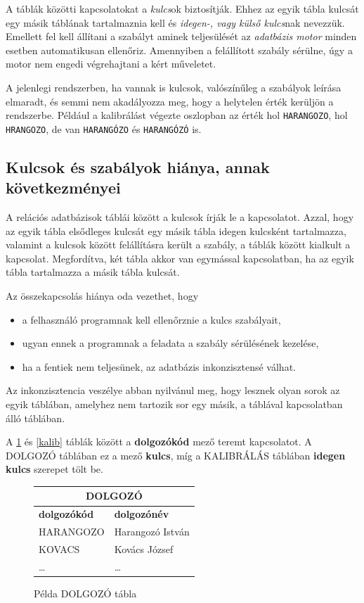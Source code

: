 \documentclass[a4paper,12pt]{report}
\begin{document}
A táblák közötti kapcsolatokat a \textit{kulcs}ok biztosítják. Ehhez az egyik 
tábla kulcsát egy másik táblának tartalmaznia kell és \textit{idegen-, vagy 
külső kulcs}nak nevezzük. Emellett fel kell állítani a szabályt aminek 
teljesülését az \textit{adatbázis motor} minden esetben automatikusan ellenőriz. 
Amennyiben a felállított szabály sérülne, úgy a motor nem engedi végrehajtani a 
kért műveletet.

A jelenlegi rendszerben, ha vannak is kulcsok, valószínűleg a szabályok leírása 
elmaradt, és semmi nem akadályozza meg, hogy a helytelen érték kerüljön a 
rendszerbe. Például a kalibrálást végezte oszlopban az érték hol 
\texttt{HARANGOZO}, hol \texttt{HRANGOZO}, de van \texttt{HARANGÓZO} és 
\texttt{HARANGÓZÓ} is.

\subsection{Kulcsok és szabályok hiánya, annak következményei}
A relációs adatbázisok táblái között a kulcsok írják le a kapcsolatot. Azzal, 
hogy az egyik tábla elsődleges kulcsát egy másik tábla idegen kulcsként 
tartalmazza, valamint a kulcsok között felállításra került a szabály, a táblák 
között kialkult a kapcsolat. Megfordítva, két tábla akkor van egymással 
kapcsolatban, ha az egyik tábla tartalmazza a másik tábla kulcsát.

Az összekapcsolás hiánya oda vezethet, hogy
\begin{itemize}
\item a felhasználó programnak kell ellenőrznie a kulcs szabályait,
\item ugyan ennek a programnak a feladata a szabály sérülésének kezelése,
\item ha a fentiek nem teljesünek, az adatbázis inkonzisztensé válhat.
\end{itemize}

Az inkonzisztencia veszélye abban nyilvánul meg, hogy lesznek olyan sorok az 
egyik táblában, amelyhez nem tartozik sor egy másik, a táblával kapcsolatban 
álló táblában.

A \ref{dolg} és \ref{kalib} táblák között a \textbf{dolgozókód} mező teremt
kapcsolatot. A DOLGOZÓ táblában ez a mező \textbf{kulcs}, míg a KALIBRÁLÁS 
táblában \textbf{idegen kulcs} szerepet tölt be.

\begin{figure}[ht!] \centering
\begin{tabular}{|l|l|}
        \hline
        \multicolumn{2}{|c|}{\textbf{DOLGOZÓ}}\\
        \hline
        \textbf{dolgozókód}&\textbf{dolgozónév}\\
        \hline
        HARANGOZO&Harangozó István\\
        \hline
        KOVACS&Kovács József\\
        \hline
        \dots&\dots\\
        \end{tabular}
        \caption{Példa DOLGOZÓ tábla}\label{dolg}
\end{figure}
\end{document}
